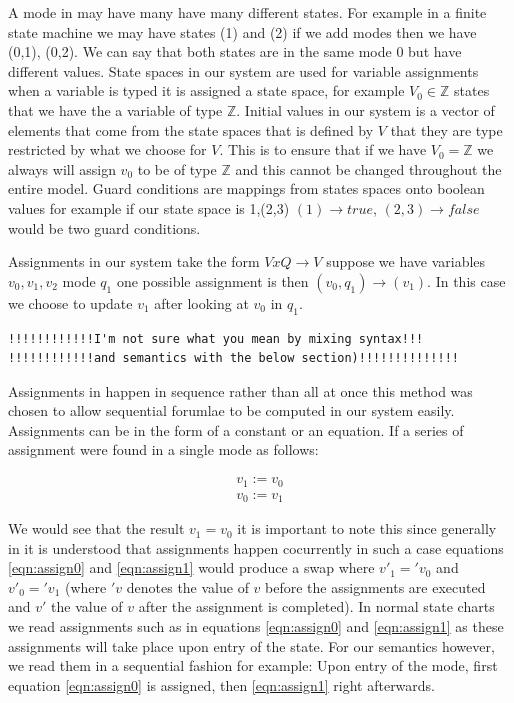 A mode in \plccharts may have many have many different states. For example in a finite state machine we may have states (1) and (2) if we add modes then we have (0,1), (0,2). We can say that both states are in the same mode 0 but have different values. State spaces in our system are used for variable assignments when a variable is typed it is assigned a state space, for example $V_0 \in \mathbb{Z}$ states that we have the a variable of type $\mathbb{Z}$. Initial values in our system is a vector of elements that come from the state spaces that is defined by $V$ that they are type restricted by what we choose for $V$. This is to ensure that if we have $V_0 = \mathbb{Z}$ we always will assign $v_0$ to be of type $\mathbb{Z}$ and this cannot be changed throughout the entire model. Guard conditions are mappings from states spaces onto boolean values for example if our state space is {1,(2,3)} $(1) \rightarrow true$, $(2,3) \rightarrow false$ would be two guard conditions.

Assignments in our system take the form $V x Q \rightarrow V$ suppose we have variables $v_0,v_1,v_2$ mode $q_1$ one possible assignment is then $(v_0,q_1) \rightarrow (v_1)$. In this case we choose to update $v_1$ after looking at $v_0$ in $q_1$.   

\begin{verbatim}
!!!!!!!!!!!!I'm not sure what you mean by mixing syntax!!! 
!!!!!!!!!!!!and semantics with the below section)!!!!!!!!!!!!!!
\end{verbatim}

Assignments in \plccharts happen in sequence rather than all at once this method was chosen to allow sequential forumlae to be computed in our system easily. Assignments can be in the form of a constant or an equation. If a series of assignment were found in a single mode as follows:

\begin{align}
v_1 := v_0 \label{eqn:assign0} \\ 
v_0 := v_1 \label{eqn:assign1}
\end{align}

We would see that the result $v_1 = v_0$ it is important to note this since generally in \cite{StateChartVis}  it is understood that assignments happen cocurrently in such a case equations \ref{eqn:assign0} and \ref{eqn:assign1} would produce a swap where $v'_1 = 'v_0$ and $v'_0 = 'v_1$ (where $'v$ denotes the value of $v$ before the assignments are executed and $v'$ the value of $v$ after the assignment is completed). In normal state charts we read assignments such as in equations \ref{eqn:assign0} and \ref{eqn:assign1} as these assignments will take place upon entry of the state. For our semantics however, we read them in a sequential fashion for example: Upon entry of the mode, first equation \ref{eqn:assign0} is assigned, then \ref{eqn:assign1} right afterwards.

